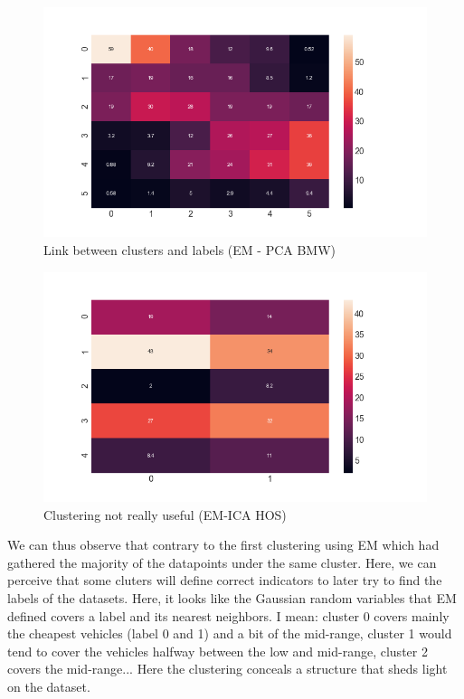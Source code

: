 \documentclass[15pt]{article}
\begin{document}
\begin{multicols}{2}
\begin{figure}[H]
\centering 
\includegraphics[width = \columnwidth]{grBMWgmpca.png}
\caption{Link between clusters and labels (EM - PCA BMW)}
\end{figure}

\begin{figure}[H]
\centering
\includegraphics[width = \columnwidth]{grhosgmica.png}
\caption{Clustering not really useful (EM-ICA HOS)}
\end{figure}

We can thus observe that contrary to the first clustering using EM which had gathered the majority of the datapoints under the same cluster. Here, we can perceive that some cluters will define correct indicators to later try to find the labels of the datasets. Here, it looks like the Gaussian random variables that EM defined covers a label and its nearest neighbors. I mean: cluster 0 covers mainly the cheapest vehicles (label 0 and 1) and a bit of the mid-range, cluster 1 would tend to cover the vehicles halfway between the low and mid-range, cluster 2 covers the mid-range... Here the clustering conceals a structure that sheds light on the dataset.


\end{multicols}
\end{document}
